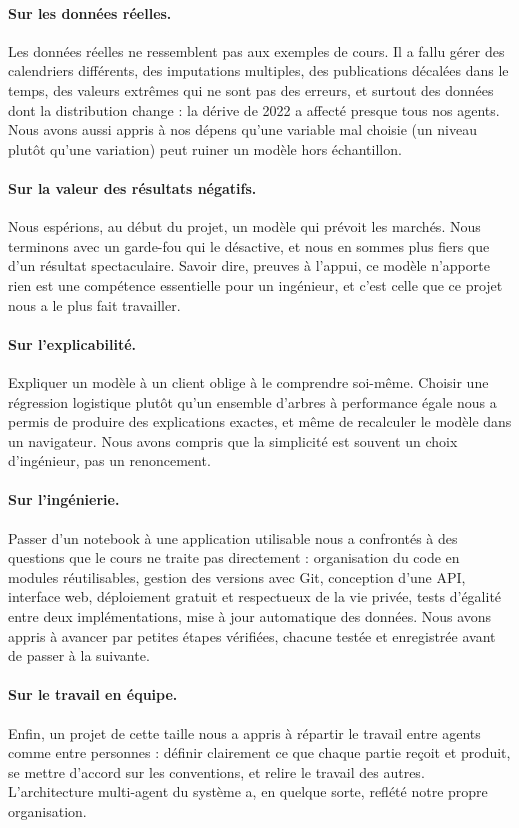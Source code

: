 \paragraph{Sur les données réelles.} Les données réelles ne ressemblent pas aux exemples de cours. Il a fallu gérer des calendriers différents, des imputations multiples, des publications décalées dans le temps, des valeurs extrêmes qui ne sont pas des erreurs, et surtout des données dont la distribution change : la dérive de 2022 a affecté presque tous nos agents. Nous avons aussi appris à nos dépens qu'une variable mal choisie (un niveau plutôt qu'une variation) peut ruiner un modèle hors échantillon.

\paragraph{Sur la valeur des résultats négatifs.} Nous espérions, au début du projet, un modèle qui prévoit les marchés. Nous terminons avec un garde-fou qui le désactive, et nous en sommes plus fiers que d'un résultat spectaculaire. Savoir dire, preuves à l'appui, \og ce modèle n'apporte rien \fg{} est une compétence essentielle pour un ingénieur, et c'est celle que ce projet nous a le plus fait travailler.

\paragraph{Sur l'explicabilité.} Expliquer un modèle à un client oblige à le comprendre soi-même. Choisir une régression logistique plutôt qu'un ensemble d'arbres à performance égale nous a permis de produire des explications exactes, et même de recalculer le modèle dans un navigateur. Nous avons compris que la simplicité est souvent un choix d'ingénieur, pas un renoncement.

\paragraph{Sur l'ingénierie.} Passer d'un notebook à une application utilisable nous a confrontés à des questions que le cours ne traite pas directement : organisation du code en modules réutilisables, gestion des versions avec Git, conception d'une API, interface web, déploiement gratuit et respectueux de la vie privée, tests d'égalité entre deux implémentations, mise à jour automatique des données. Nous avons appris à avancer par petites étapes vérifiées, chacune testée et enregistrée avant de passer à la suivante.

\paragraph{Sur le travail en équipe.} Enfin, un projet de cette taille nous a appris à répartir le travail entre agents comme entre personnes : définir clairement ce que chaque partie reçoit et produit, se mettre d'accord sur les conventions, et relire le travail des autres. L'architecture multi-agent du système a, en quelque sorte, reflété notre propre organisation.
